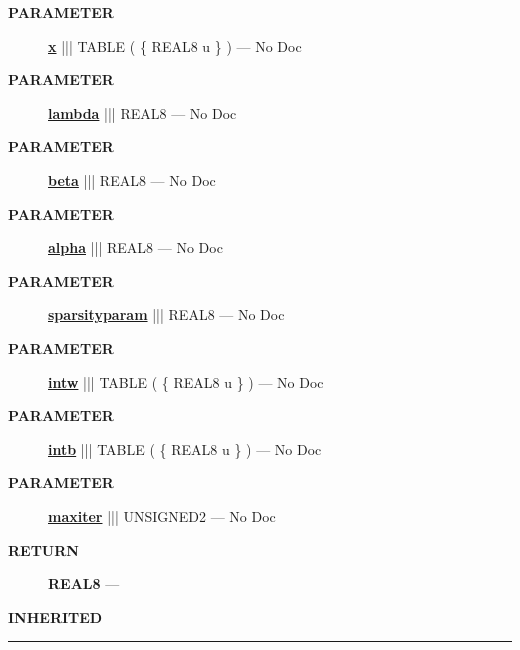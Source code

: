 \par
\begin{description}
\item [\colorbox{tagtype}{\color{white} \textbf{\textsf{PARAMETER}}}] \textbf{\underline{x}} ||| TABLE ( \{ REAL8 u \} ) --- No Doc
\item [\colorbox{tagtype}{\color{white} \textbf{\textsf{PARAMETER}}}] \textbf{\underline{lambda}} ||| REAL8 --- No Doc
\item [\colorbox{tagtype}{\color{white} \textbf{\textsf{PARAMETER}}}] \textbf{\underline{beta}} ||| REAL8 --- No Doc
\item [\colorbox{tagtype}{\color{white} \textbf{\textsf{PARAMETER}}}] \textbf{\underline{alpha}} ||| REAL8 --- No Doc
\item [\colorbox{tagtype}{\color{white} \textbf{\textsf{PARAMETER}}}] \textbf{\underline{sparsityparam}} ||| REAL8 --- No Doc
\item [\colorbox{tagtype}{\color{white} \textbf{\textsf{PARAMETER}}}] \textbf{\underline{intw}} ||| TABLE ( \{ REAL8 u \} ) --- No Doc
\item [\colorbox{tagtype}{\color{white} \textbf{\textsf{PARAMETER}}}] \textbf{\underline{intb}} ||| TABLE ( \{ REAL8 u \} ) --- No Doc
\item [\colorbox{tagtype}{\color{white} \textbf{\textsf{PARAMETER}}}] \textbf{\underline{maxiter}} ||| UNSIGNED2 --- No Doc
\end{description}







\par
\begin{description}
\item [\colorbox{tagtype}{\color{white} \textbf{\textsf{RETURN}}}] \textbf{REAL8} --- 
\end{description}






\par
\begin{description}
\item [\colorbox{tagtype}{\color{white} \textbf{\textsf{INHERITED}}}] 
\end{description}



\rule{\linewidth}{0.5pt}




